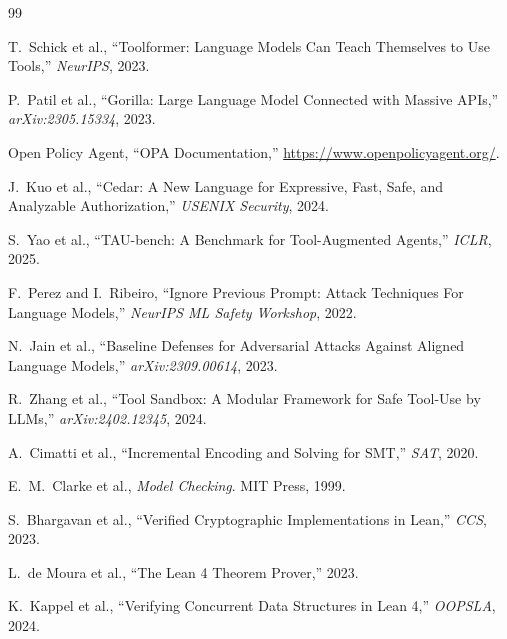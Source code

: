 \documentclass[10pt,twocolumn]{article}
\begin{document}
\balance
\begin{thebibliography}{99}

T.\ Schick et al.,
``Toolformer: Language Models Can Teach Themselves to Use Tools,''
\emph{NeurIPS}, 2023.

P.\ Patil et al.,
``Gorilla: Large Language Model Connected with Massive APIs,''
\emph{arXiv:2305.15334}, 2023.

Open Policy Agent,
``OPA Documentation,'' \url{https://www.openpolicyagent.org/}.

J.\ Kuo et al.,
``Cedar: A New Language for Expressive, Fast, Safe, and Analyzable
Authorization,'' \emph{USENIX Security}, 2024.

S.\ Yao et al.,
``TAU-bench: A Benchmark for Tool-Augmented Agents,''
\emph{ICLR}, 2025.

F.\ Perez and I.\ Ribeiro,
``Ignore Previous Prompt: Attack Techniques For Language Models,''
\emph{NeurIPS ML Safety Workshop}, 2022.

N.\ Jain et al.,
``Baseline Defenses for Adversarial Attacks Against Aligned Language
Models,'' \emph{arXiv:2309.00614}, 2023.

R.\ Zhang et al.,
``Tool Sandbox: A Modular Framework for Safe Tool-Use by LLMs,''
\emph{arXiv:2402.12345}, 2024.

A.\ Cimatti et al.,
``Incremental Encoding and Solving for SMT,''
\emph{SAT}, 2020.

E.\ M.\ Clarke et al.,
\emph{Model Checking}. MIT Press, 1999.

S.\ Bhargavan et al.,
``Verified Cryptographic Implementations in Lean,''
\emph{CCS}, 2023.

L.\ de Moura et al.,
``The Lean 4 Theorem Prover,'' 2023.

K.\ Kappel et al.,
``Verifying Concurrent Data Structures in Lean 4,''
\emph{OOPSLA}, 2024.

\end{thebibliography}
\end{document}
